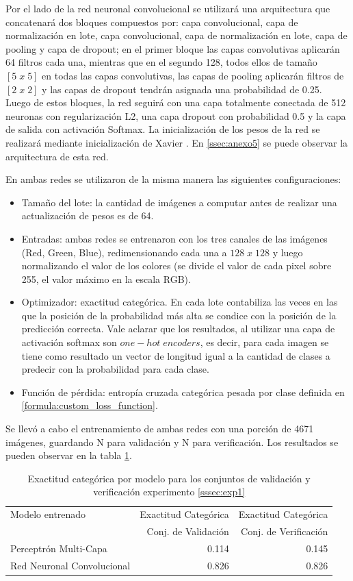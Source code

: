 Por el lado de la red neuronal convolucional se utilizará una arquitectura que concatenará dos bloques compuestos por: capa convolucional, capa de normalización en lote, capa convolucional, capa de normalización en lote, capa de pooling y capa de dropout; en el primer bloque las capas convolutivas aplicarán 64 filtros cada una, mientras que en el segundo 128, todos ellos de tamaño \([5\;x\;5]\) en todas las capas convolutivas, las capas de pooling aplicarán filtros de \([2\;x\;2]\) y las capas de dropout tendrán asignada una probabilidad de 0.25. Luego de estos bloques, la red seguirá con una capa totalmente conectada de 512 neuronas con regularización L2, una capa dropout con probabilidad 0.5 y la capa de salida con activación Softmax. La inicialización de los pesos de la red se realizará mediante inicialización de Xavier \cite{glorot2010understanding}. En \ref{ssec:anexo5} se puede observar la arquitectura de esta red.

En ambas redes se utilizaron de la misma manera las siguientes configuraciones: 
\begin{itemize}
	\item Tamaño del lote: la cantidad de imágenes a computar antes de realizar una actualización de pesos es de 64.
	\item Entradas: ambas redes se entrenaron con los tres canales de las imágenes (Red, Green, Blue), redimensionando cada una a \(128\; x\; 128\) y luego normalizando el valor de los colores (se divide el valor de cada pixel sobre 255, el valor máximo en la escala RGB).
	\item Optimizador: exactitud categórica. En cada lote contabiliza las veces en las que la posición de la probabilidad más alta se condice con la posición de la predicción correcta. Vale aclarar que los resultados, al utilizar una capa de activación softmax son \(one-hot\; encoders\), es decir, para cada imagen se tiene como resultado un vector de longitud igual a la cantidad de clases a predecir con la probabilidad para cada clase. 
	\item Función de pérdida: entropía cruzada categórica pesada por clase definida en  \ref{formula:custom_loss_function}.
\end{itemize}

Se llevó a cabo el entrenamiento de ambas redes con una porción de 4671 imágenes, guardando N para validación y N para verificación. Los resultados se pueden observar en la tabla \ref{exp1:results}.

\begin{table}[h!]
	\centering
	\begin{tabular}{| l | r | r |}
		\toprule
		Modelo entrenado & Exactitud Categórica &  Exactitud Categórica \\
		{} & Conj. de Validación &  Conj. de Verificación \\
		\midrule
		Perceptrón Multi-Capa & 0.114 & 0.145 \\
		Red Neuronal Convolucional & 0.826 & 0.826\\
		\bottomrule
	\end{tabular}
	\caption{Exactitud categórica por modelo para los conjuntos de validación y verificación experimento \ref{sssec:exp1}}
	\label{exp1:results}
\end{table}


